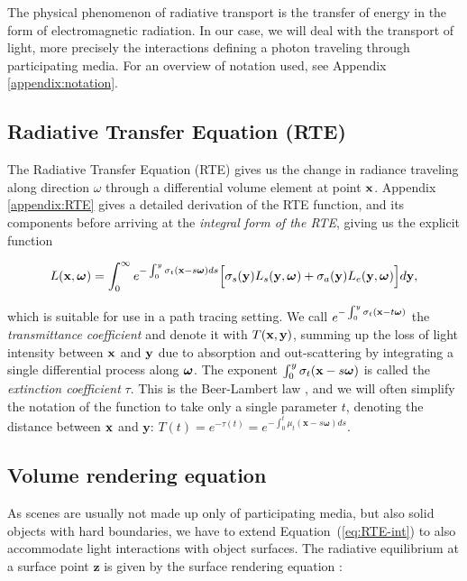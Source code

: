 The physical phenomenon of radiative transport is the transfer of energy
in the form of electromagnetic radiation. In our case, we will deal with the transport of 
light, more precisely the interactions defining a photon traveling through participating media. For an overview of notation used, see Appendix \ref{appendix:notation}.

\subsection{Radiative Transfer Equation (RTE)}

The Radiative Transfer Equation (RTE) gives us the change in radiance traveling along direction $\omega$ through a differential volume element at point $\textbf{x}$. 
Appendix \ref{appendix:RTE} gives a detailed derivation of the RTE function, and its components before arriving at the \textit{integral form of the RTE}, giving us the explicit function

\begin{equation} \label{eq:RTE-int}
L(\textbf{x}, \boldsymbol{\omega}) = \int_0^\infty 
e^{-\int_0^y{\sigma_t(\textbf{x}-s\boldsymbol{\omega})}ds}
\Big[
    \sigma_s(\textbf{y})L_s(\textbf{y}, \boldsymbol{\omega}) + \sigma_a(\textbf{y})L_e(\textbf{y}, \boldsymbol{\omega})
\Big]
d\textbf{y},
\end{equation}

which is suitable for use in a path tracing setting.
We call $e^{-\int_0^y{\sigma_t(\textbf{x}-t\boldsymbol{\omega})}}$ the  
\textit{transmittance coefficient} and denote it with $T(\textbf{x}, \textbf{y})$,
summing up the loss of light intensity between $\textbf{x}$ and 
$\textbf{y}$ due to absorption and out-scattering by integrating a single differential 
process along $\boldsymbol{\omega}$. The exponent
$\int_0^y{\sigma_t(\textbf{x}-s\boldsymbol{\omega})}$ 
is called the \textit{extinction coefficient} $\tau$. This is the Beer-Lambert law \cite{Lambert}, and we will often simplify the notation of the
function to take only a single parameter $t$, denoting the distance between $\textbf{x}$ and
$\textbf{y}$: $T(t) = e^{-\tau(t)} =e^{-\int_0^t{\mu_t(\boldsymbol{x}-s\boldsymbol\omega)}ds}$.

\subsection{Volume rendering equation}
As scenes are usually not made up only of participating media, but also solid objects
with hard boundaries, we have to extend Equation~(\ref{eq:RTE-int}) to also 
accommodate light interactions with object surfaces. The radiative equilibrium at a surface point $\textbf{z}$ is given by the surface rendering equation \cite{Kaj86}:

